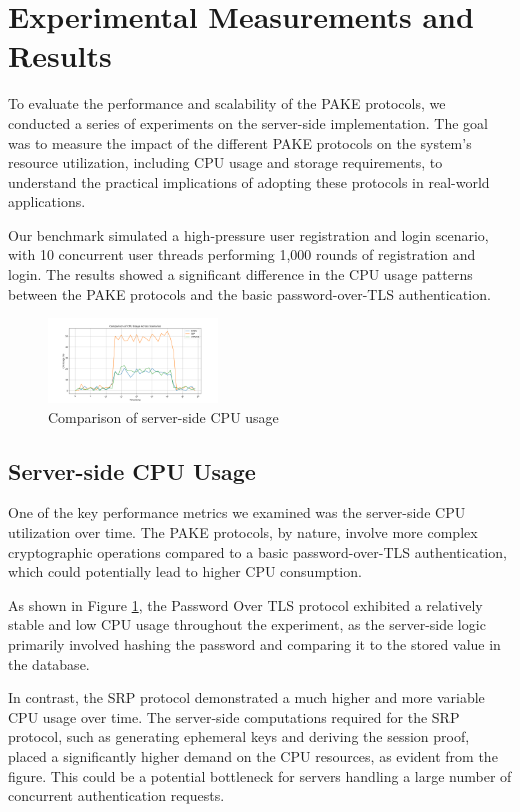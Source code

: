 \section{Experimental Measurements and Results}
\label{sec:exp_results}

To evaluate the performance and scalability of the PAKE protocols, we conducted a series of experiments on the server-side implementation. The goal was to measure the impact of the different PAKE protocols on the system's resource utilization, including CPU usage and storage requirements, to understand the practical implications of adopting these protocols in real-world applications.

Our benchmark simulated a high-pressure user registration and login scenario, with 10 concurrent user threads performing 1,000 rounds of registration and login. The results showed a significant difference in the CPU usage patterns between the PAKE protocols and the basic password-over-TLS authentication.

\begin{figure}[ht]
  \centering
  \includegraphics[width=0.4\textwidth]{./images/cpu_usage_comparison.png}
  \caption{Comparison of server-side CPU usage}
  \label{fig:cpu_usage}
\end{figure}

\subsection{Server-side CPU Usage}

One of the key performance metrics we examined was the server-side CPU utilization over time. The PAKE protocols, by nature, involve more complex cryptographic operations compared to a basic password-over-TLS authentication, which could potentially lead to higher CPU consumption.

As shown in Figure \ref{fig:cpu_usage}, the Password Over TLS protocol exhibited a relatively stable and low CPU usage throughout the experiment, as the server-side logic primarily involved hashing the password and comparing it to the stored value in the database.

In contrast, the SRP protocol demonstrated a much higher and more variable CPU usage over time. The server-side computations required for the SRP protocol, such as generating ephemeral keys and deriving the session proof, placed a significantly higher demand on the CPU resources, as evident from the figure. This could be a potential bottleneck for servers handling a large number of concurrent authentication requests.

